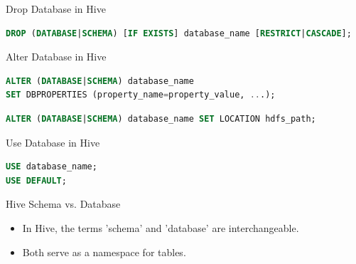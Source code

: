 \begin{frame}[fragile]{Drop Database in Hive}

\begin{lstlisting}[caption={Drop Database command in Hive},language=SQL]
DROP (DATABASE|SCHEMA) [IF EXISTS] database_name [RESTRICT|CASCADE];
\end{lstlisting}		
	
\end{frame} 

\begin{frame}[fragile]{Alter Database in Hive}

\begin{lstlisting}[caption={Alter Database command in Hive},language=SQL]
ALTER (DATABASE|SCHEMA) database_name 
SET DBPROPERTIES (property_name=property_value, ...);
\end{lstlisting}		
\begin{lstlisting}[caption={Alter Database Example},language=SQL]
ALTER (DATABASE|SCHEMA) database_name SET LOCATION hdfs_path;
\end{lstlisting}		
\end{frame} 

\begin{frame}[fragile]{Use Database in Hive}

\begin{lstlisting}[caption={Alter Database command in Hive},language=SQL]
USE database_name;
USE DEFAULT;
\end{lstlisting}		
\end{frame} 

\begin{frame}[fragile]{Hive Schema vs. Database}		  
	\begin{itemize}
	  \item In Hive, the terms 'schema' and 'database' are interchangeable.
	  \item Both serve as a namespace for tables.
	\end{itemize}	
	\begin{tcolorbox}[colback=white, colframe=black, title=\scriptsize From Hive Documentation]
		\small {}
	  \end{tcolorbox}
	
\end{frame}


